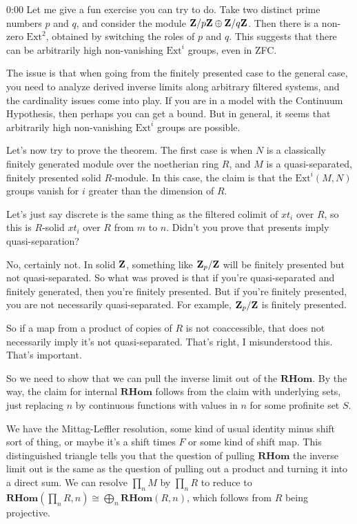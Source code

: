 \begin{unfinished}{0:00}
Let me give a fun exercise you can try to do. Take two distinct prime numbers $p$ and $q$, and consider the module $\mathbf Z/p\mathbf Z \oplus \mathbf Z/q\mathbf Z$. Then there is a non-zero $\text{Ext}^2$, obtained by switching the roles of $p$ and $q$. This suggests that there can be arbitrarily high non-vanishing $\text{Ext}^i$ groups, even in ZFC.

The issue is that when going from the finitely presented case to the general case, you need to analyze derived inverse limits along arbitrary filtered systems, and the cardinality issues come into play. If you are in a model with the Continuum Hypothesis, then perhaps you can get a bound. But in general, it seems that arbitrarily high non-vanishing $\text{Ext}^i$ groups are possible.

Let's now try to prove the theorem. The first case is when $N$ is a classically finitely generated module over the noetherian ring $R$, and $M$ is a quasi-separated, finitely presented solid $R$-module. In this case, the claim is that the $\text{Ext}^i(M, N)$ groups vanish for $i$ greater than the dimension of $R$.

Let's just say discrete is the same thing as the filtered colimit of $\mathit{xt}_i$ over $R$, so this is $R$-solid $\mathit{xt}_i$ over $R$ from $m$ to $n$. Didn't you prove that presents imply quasi-separation?

No, certainly not. In solid $\mathbf Z$, something like $\mathbf Z_p/\mathbf Z$ will be finitely presented but not quasi-separated. So what was proved is that if you're quasi-separated and finitely generated, then you're finitely presented. But if you're finitely presented, you are not necessarily quasi-separated. For example, $\mathbf Z_p/\mathbf Z$ is finitely presented.

So if a map from a product of copies of $R$ is not coaccessible, that does not necessarily imply it's not quasi-separated. That's right, I misunderstood this. That's important.

So we need to show that we can pull the inverse limit out of the $\mathbf{R}\mathbf{Hom}$. By the way, the claim for internal $\mathbf{R}\mathbf{Hom}$ follows from the claim with underlying sets, just replacing $n$ by continuous functions with values in $n$ for some profinite set $S$.

We have the Mittag-Leffler resolution, some kind of usual identity minus shift sort of thing, or maybe it's a shift times $F$ or some kind of shift map. This distinguished triangle tells you that the question of pulling $\mathbf{R}\mathbf{Hom}$ the inverse limit out is the same as the question of pulling out a product and turning it into a direct sum. We can resolve $\prod_n M$ by $\prod_n R$ to reduce to $\mathbf{R}\mathbf{Hom}(\prod_n R, n) \cong \bigoplus_n \mathbf{R}\mathbf{Hom}(R, n)$, which follows from $R$ being projective.


\end{unfinished}
